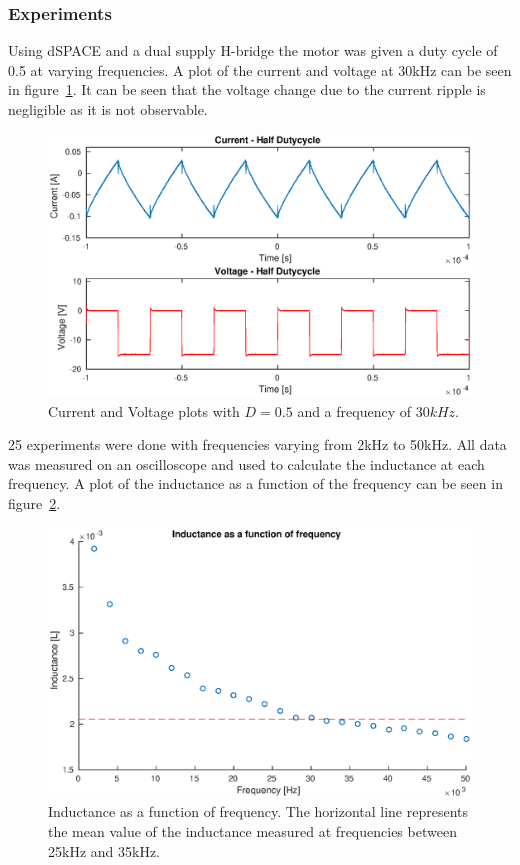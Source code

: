 \subsubsection{Experiments}
Using dSPACE and a dual supply H-bridge the motor was given a duty cycle of 0.5 at varying frequencies.
A plot of the current and voltage at 30kHz can be seen in figure~\ref{fig:half_duty}.
It can be seen that the voltage change due to the current ripple is negligible as it is not observable.


\begin{figure}[!h]
	\centering
	\includegraphics[width=.75\linewidth]{graphics/half_duty}
	\caption{Current and Voltage plots with $D = 0.5$ and a frequency of $30kHz$.}
	\label{fig:half_duty}
\end{figure}

25 experiments were done with frequencies varying from 2kHz to 50kHz.
All data was measured on an oscilloscope and used to calculate the inductance at each frequency.
A plot of the inductance as a function of the frequency can be seen in figure~\ref{fig:inductance_freq}.

\begin{figure}[!h]
	\centering
	\includegraphics[width=.75\linewidth]{graphics/l_freq}
	\caption{Inductance as a function of frequency. The horizontal line represents the mean value of the inductance measured at frequencies between 25kHz and 35kHz.}
	\label{fig:inductance_freq}
\end{figure}

